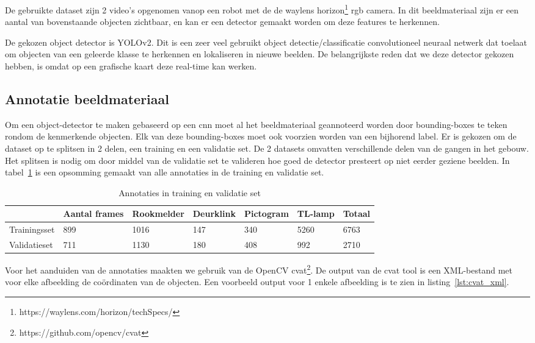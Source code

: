 De gebruikte dataset zijn 2 video's opgenomen vanop een robot met de de waylens horizon\footnote{https://waylens.com/horizon/techSpecs/} \gls{rgb} camera.
In dit beeldmateriaal zijn er een aantal van bovenstaande objecten zichtbaar, en kan er een detector gemaakt worden om deze features te herkennen.

De gekozen object detector is YOLOv2\cite{yolov22016}.
Dit is een zeer veel gebruikt object detectie/classificatie convolutioneel neuraal netwerk dat toelaat om objecten van een geleerde klasse te herkennen en lokaliseren in nieuwe beelden.
De belangrijkste reden dat we deze detector gekozen hebben, is omdat op een grafische kaart deze real-time kan werken.


\subsection{Annotatie beeldmateriaal}
Om een object-detector te maken gebaseerd op een \gls{cnn} moet al het beeldmateriaal geannoteerd worden door bounding-boxes te teken rondom de kenmerkende objecten.
Elk van deze bounding-boxes moet ook voorzien worden van een bijhorend label.
Er is gekozen om de dataset op te splitsen in 2 delen, een training en een validatie set.
De 2 datasets omvatten verschillende delen van de gangen in het gebouw.
Het splitsen is nodig om door middel van de validatie set te valideren hoe goed de detector presteert op niet eerder geziene beelden.
In tabel~\ref{tab:annotaties} is een opsomming gemaakt van alle annotaties in de training en validatie set.

\begin{table}[h]
    \caption{Annotaties in training en validatie set}\label{tab:annotaties}
    \begin{tabular}{l | l | l | l | l | l | l}
        & Aantal frames & Rookmelder & Deurklink & Pictogram & TL-lamp & Totaal \\ \hline
        Trainingsset & 899 & 1016 & 147 & 340 & 5260 & 6763 \\
        Validatieset & 711 & 1130 & 180 & 408 & 992 & 2710 \\
    \end{tabular}
\end{table}

Voor het aanduiden van de annotaties maakten we gebruik van de OpenCV \gls{cvat}\footnote{https://github.com/opencv/cvat}.
De output van de \gls{cvat} tool is een XML-bestand met voor elke afbeelding de co\"{o}rdinaten van de objecten. Een voorbeeld output voor 1 enkele afbeelding is te zien in listing~\ref{lst:cvat_xml}.

